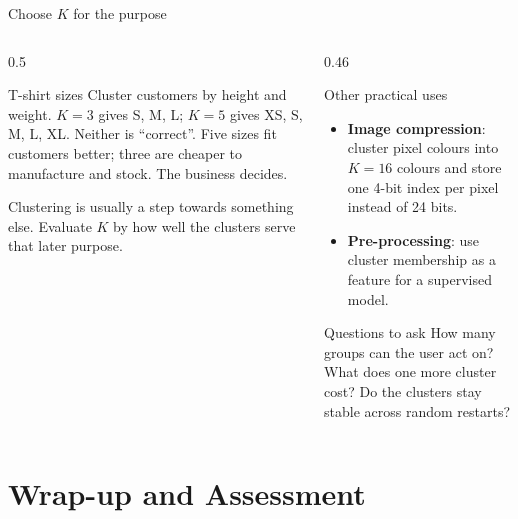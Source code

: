 \documentclass[aspectratio=169,10pt]{beamer}
\begin{document}
\begin{frame}{Choose $K$ for the purpose}
  \begin{columns}[T,onlytextwidth]
    \begin{column}{0.5\textwidth}
      \begin{block}{T-shirt sizes}
        \footnotesize
        Cluster customers by height and weight. $K=3$ gives S, M, L; $K=5$ gives XS, S,
        M, L, XL. Neither is ``correct''. Five sizes fit customers better; three are cheaper
        to manufacture and stock. The business decides.
      \end{block}
      \begin{keyidea}
        Clustering is usually a step towards something else. Evaluate $K$ by how well the
        clusters serve that later purpose.
      \end{keyidea}
    \end{column}
    \begin{column}{0.46\textwidth}
      \footnotesize
      \begin{block}{Other practical uses}
        \begin{itemize}
          \item \textbf{Image compression}: cluster pixel colours into $K=16$ colours and
                store one 4-bit index per pixel instead of 24 bits.
          \item \textbf{Pre-processing}: use cluster membership as a feature for a
                supervised model.
        \end{itemize}
      \end{block}
      \begin{block}{Questions to ask}
        How many groups can the user act on? What does one more cluster cost? Do the
        clusters stay stable across random restarts?
      \end{block}
    \end{column}
  \end{columns}
\end{frame}

\section{Wrap-up and Assessment}
\end{document}
